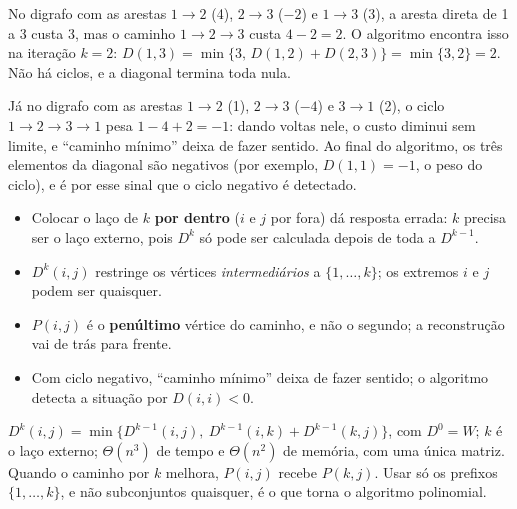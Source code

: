 \begin{exemplo}\label{ex:fwneg}
No digrafo com as arestas $1\to2$ (4), $2\to3$ ($-2$) e $1\to3$ (3), a aresta direta de 1 a 3 custa 3, mas o caminho $1\to2\to3$ custa $4-2=2$. O algoritmo encontra isso na iteração $k=2$: $D(1,3)=\min\{3,\,D(1,2)+D(2,3)\}=\min\{3,2\}=2$. Não há ciclos, e a diagonal termina toda nula.

Já no digrafo com as arestas $1\to2$ (1), $2\to3$ ($-4$) e $3\to1$ (2), o ciclo $1\to2\to3\to1$ pesa $1-4+2=-1$: dando voltas nele, o custo diminui sem limite, e ``caminho mínimo'' deixa de fazer sentido. Ao final do algoritmo, os três elementos da diagonal são negativos (por exemplo, $D(1,1)=-1$, o peso do ciclo), e é por esse sinal que o ciclo negativo é detectado.
\end{exemplo}

\begin{cuidado}
\begin{itemize}
  \item Colocar o laço de $k$ \textbf{por dentro} ($i$ e $j$ por fora) dá resposta errada: $k$ precisa ser o laço externo, pois $D^k$ só pode ser calculada depois de toda a $D^{k-1}$.
  \item $D^k(i,j)$ restringe os vértices \emph{intermediários} a $\{1,\dots,k\}$; os extremos $i$ e $j$ podem ser quaisquer.
  \item $P(i,j)$ é o \textbf{penúltimo} vértice do caminho, e não o segundo; a reconstrução vai de trás para frente.
  \item Com ciclo negativo, ``caminho mínimo'' deixa de fazer sentido; o algoritmo detecta a situação por $D(i,i)<0$.
\end{itemize}
\end{cuidado}

\begin{chave}
$D^k(i,j)=\min\{D^{k-1}(i,j),\ D^{k-1}(i,k)+D^{k-1}(k,j)\}$, com $D^0=W$; $k$ é o laço externo; $\Theta(n^3)$ de tempo e $\Theta(n^2)$ de memória, com uma única matriz. Quando o caminho por $k$ melhora, $P(i,j)$ recebe $P(k,j)$. Usar só os prefixos $\{1,\dots,k\}$, e não subconjuntos quaisquer, é o que torna o algoritmo polinomial.
\end{chave}

